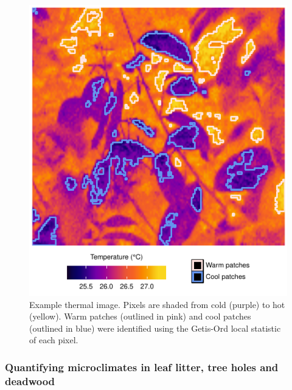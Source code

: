 \documentclass[12pt,a4paper,]{report}
\theoremstyle{definition}
\theoremstyle{definition}
\theoremstyle{definition}
\theoremstyle{remark}
\begin{document}
\begin{figure}

{\centering \includegraphics{./output/fig-4-2-1} 

}

\caption{Example thermal image. Pixels are shaded from cold (purple) to hot (yellow). Warm patches (outlined in pink) and cool patches (outlined in blue) were identified using the Getis-Ord local statistic of each pixel.}\label{fig:fig-4-2}
\end{figure}

\subsubsection*{Quantifying microclimates in leaf litter, tree holes and
deadwood}\label{quantifying-microclimates-in-leaf-litter-tree-holes-and-deadwood}
\end{document}
